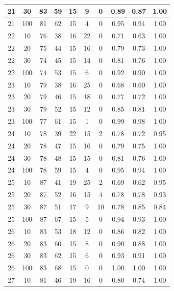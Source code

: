 \begin{longtable}{ |c|c|c|c|c|c|c|c|c|c| }
            21 & 30 & 83 & 59 & 15 & 9 & 0 & 0.89 & 0.87 & 1.00 \\ \hline
            21 & 100 & 81 & 62 & 15 & 4 & 0 & 0.95 & 0.94 & 1.00 \\ \hline
            22 & 10 & 76 & 38 & 16 & 22 & 0 & 0.71 & 0.63 & 1.00 \\ \hline
            22 & 20 & 75 & 44 & 15 & 16 & 0 & 0.79 & 0.73 & 1.00 \\ \hline
            22 & 30 & 74 & 45 & 15 & 14 & 0 & 0.81 & 0.76 & 1.00 \\ \hline
            22 & 100 & 74 & 53 & 15 & 6 & 0 & 0.92 & 0.90 & 1.00 \\ \hline
            23 & 10 & 79 & 38 & 16 & 25 & 0 & 0.68 & 0.60 & 1.00 \\ \hline
            23 & 20 & 79 & 46 & 15 & 18 & 0 & 0.77 & 0.72 & 1.00 \\ \hline
            23 & 30 & 79 & 52 & 15 & 12 & 0 & 0.85 & 0.81 & 1.00 \\ \hline
            23 & 100 & 77 & 61 & 15 & 1 & 0 & 0.99 & 0.98 & 1.00 \\ \hline
            24 & 10 & 78 & 39 & 22 & 15 & 2 & 0.78 & 0.72 & 0.95 \\ \hline
            24 & 20 & 78 & 47 & 15 & 16 & 0 & 0.79 & 0.75 & 1.00 \\ \hline
            24 & 30 & 78 & 48 & 15 & 15 & 0 & 0.81 & 0.76 & 1.00 \\ \hline
            24 & 100 & 78 & 59 & 15 & 4 & 0 & 0.95 & 0.94 & 1.00 \\ \hline
            25 & 10 & 87 & 41 & 19 & 25 & 2 & 0.69 & 0.62 & 0.95 \\ \hline
            25 & 20 & 87 & 52 & 16 & 15 & 4 & 0.78 & 0.78 & 0.93 \\ \hline
            25 & 30 & 87 & 51 & 17 & 9 & 10 & 0.78 & 0.85 & 0.84 \\ \hline
            25 & 100 & 87 & 67 & 15 & 5 & 0 & 0.94 & 0.93 & 1.00 \\ \hline
            26 & 10 & 83 & 53 & 18 & 12 & 0 & 0.86 & 0.82 & 1.00 \\ \hline
            26 & 20 & 83 & 60 & 15 & 8 & 0 & 0.90 & 0.88 & 1.00 \\ \hline
            26 & 30 & 83 & 62 & 15 & 6 & 0 & 0.93 & 0.91 & 1.00 \\ \hline
            26 & 100 & 83 & 68 & 15 & 0 & 0 & 1.00 & 1.00 & 1.00 \\ \hline
            27 & 10 & 81 & 46 & 19 & 16 & 0 & 0.80 & 0.74 & 1.00 \\ \hline

\end{longtable}
